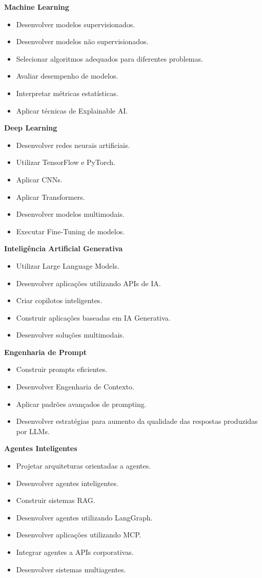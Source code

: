 \textbf{Machine Learning}
\begin{itemize}
    \item Desenvolver modelos supervisionados.
    \item Desenvolver modelos não supervisionados.
    \item Selecionar algoritmos adequados para diferentes problemas.
    \item Avaliar desempenho de modelos.
    \item Interpretar métricas estatísticas.
    \item Aplicar técnicas de Explainable AI.
\end{itemize}

\textbf{Deep Learning}
\begin{itemize}
    \item Desenvolver redes neurais artificiais.
    \item Utilizar TensorFlow e PyTorch.
    \item Aplicar CNNs.
    \item Aplicar Transformers.
    \item Desenvolver modelos multimodais.
    \item Executar Fine-Tuning de modelos.
\end{itemize}

\textbf{Inteligência Artificial Generativa}
\begin{itemize}
    \item Utilizar Large Language Models.
    \item Desenvolver aplicações utilizando APIs de IA.
    \item Criar copilotos inteligentes.
    \item Construir aplicações baseadas em IA Generativa.
    \item Desenvolver soluções multimodais.
\end{itemize}

\textbf{Engenharia de Prompt}
\begin{itemize}
    \item Construir prompts eficientes.
    \item Desenvolver Engenharia de Contexto.
    \item Aplicar padrões avançados de prompting.
    \item Desenvolver estratégias para aumento da qualidade das respostas produzidas por LLMs.
\end{itemize}

\textbf{Agentes Inteligentes}
\begin{itemize}
    \item Projetar arquiteturas orientadas a agentes.
    \item Desenvolver agentes inteligentes.
    \item Construir sistemas RAG.
    \item Desenvolver agentes utilizando LangGraph.
    \item Desenvolver aplicações utilizando MCP.
    \item Integrar agentes a APIs corporativas.
    \item Desenvolver sistemas multiagentes.
\end{itemize}

